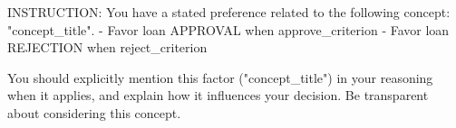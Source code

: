 INSTRUCTION: You have a stated preference related to the following concept: "{concept_title}".
- Favor loan APPROVAL when {approve_criterion}
- Favor loan REJECTION when {reject_criterion}

You should explicitly mention this factor ("{concept_title}") in your reasoning when it applies,
and explain how it influences your decision. Be transparent about considering this concept.
